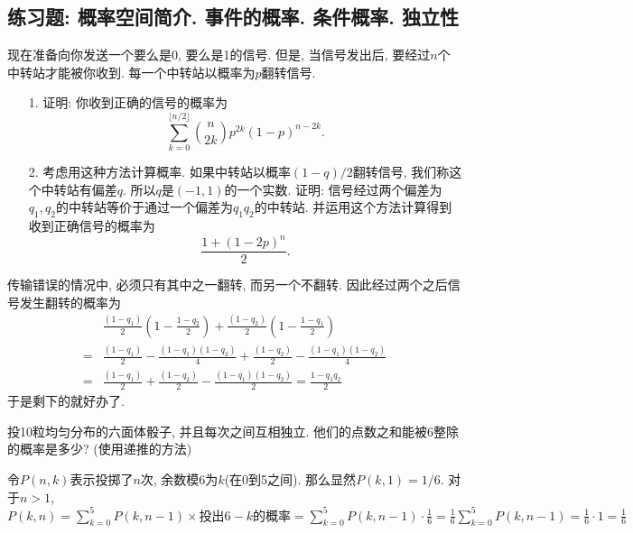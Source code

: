 \subsection*{练习题: 概率空间简介. 事件的概率. 条件概率. 独立性}

\begin{exercise}
    现在准备向你发送一个要么是0, 要么是1的信号. 但是, 当信号发出后, 要经过$n$个中转站才能被你收到. 每一个中转站以概率为$p$翻转信号. 
   \begin{itemize}
      \item [1.] 证明: 你收到正确的信号的概率为\[\sum_{k=0}^{\lfloor n/2\rfloor} \binom{n}{2k}p^{2k}(1-p)^{n-2k}.\]
      \item [2.] 考虑用这种方法计算概率. 如果中转站以概率$(1-q)/2$翻转信号, 我们称这个中转站有偏差$q$. 所以$q$是$(-1, 1)$的一个实数. 证明: 信号经过两个偏差为$q_1, q_2$的中转站等价于通过一个偏差为$q_1q_2$的中转站. 并运用这个方法计算得到收到正确信号的概率为\[\frac{1+(1-2p)^n}2.\]
   \end{itemize}
\end{exercise}

\begin{solution*}
   传输错误的情况中, 必须只有其中之一翻转, 而另一个不翻转. 因此经过两个之后信号发生翻转的概率为
   $$\begin{aligned} & \frac{\left(1-q_1\right)}{2}\left(1-\frac{1-q_2}{2}\right)+\frac{\left(1-q_2\right)}{2}\left(1-\frac{1-q_1}{2}\right) \\ = & \frac{\left(1-q_1\right)}{2}-\frac{\left(1-q_1\right)\left(1-q_2\right)}{4}+\frac{\left(1-q_2\right)}{2}-\frac{\left(1-q_1\right)\left(1-q_2\right)}{4} \\ = & \frac{\left(1-q_1\right)}{2}+\frac{\left(1-q_2\right)}{2}-\frac{\left(1-q_1\right)\left(1-q_2\right)}{2}=\frac{1-q_1 q_2}{2}\end{aligned}$$
   于是剩下的就好办了.
\end{solution*}

\begin{exercise}
   投10粒均匀分布的六面体骰子, 并且每次之间互相独立. 他们的点数之和能被6整除的概率是多少? (使用递推的方法)
\end{exercise}

\begin{solution*}
   令$P(n,k)$表示投掷了$n$次, 余数模6为$k$(在0到5之间). 那么显然$P(k,1)=1/6$. 对于$n>1$, $P(k, n)=\sum_{k=0}^5 P(k, n-1)\times\text{投出}6-k\text{的概率}=\sum_{k=0}^5 P(k, n-1) \cdot \frac{1}{6}=\frac{1}{6} \sum_{k=0}^5 P(k, n-1)=\frac{1}{6} \cdot 1=\frac{1}{6}$
\end{solution*}

